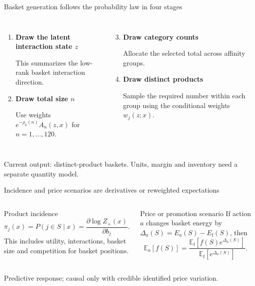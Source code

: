 \documentclass[aspectratio=169,11pt,t]{beamer}
\newcommand{\blue}[1]{\textcolor{Accent}{#1}}
\begin{document}
\begin{frame}{Basket generation follows the probability law in four stages}
\small
\begin{columns}[T,onlytextwidth]
  \begin{enumerate}
    \item \textbf{Draw the latent interaction state $z$}\par
          This summarizes the low-rank basket interaction direction.
    \item \textbf{Draw total size $n$}\par
          Use weights $e^{-\rho_0(n)}A_n(z,x)$ for $n=1,\ldots,120$.
  \end{enumerate}

  \begin{enumerate}
    \setcounter{enumi}{2}
    \item \textbf{Draw category counts}\par
          Allocate the selected total across affinity groups.
    \item \textbf{Draw distinct products}\par
          Sample the required number within each group using the conditional weights
          $w_j(z;x)$.
  \end{enumerate}
\end{columns}

\vspace{0.10cm}
\blue{Current output: distinct-product baskets. Units, margin and inventory need a
separate quantity model.}
\end{frame}

\begin{frame}{Incidence and price scenarios are derivatives or reweighted expectations}
\small
\begin{columns}[T,onlytextwidth]
  \begin{block}{Product incidence}
  \[
  \pi_j(x)=P(j\in S\mid x)
  =\frac{\partial\log Z_{+}(x)}{\partial b_j}.
  \]
  This includes utility, interactions, basket size and competition for basket positions.
  \end{block}

  \begin{block}{Price or promotion scenario}
  If action $a$ changes basket energy by
  $\Delta_a(S)=E_a(S)-E_{\mathrm f}(S)$, then
  \[
  \mathbb E_a[f(S)]
  =\frac{\mathbb E_{\mathrm f}[f(S)e^{\Delta_a(S)}]}
  {\mathbb E_{\mathrm f}[e^{\Delta_a(S)}]}.
  \]
  \end{block}
\end{columns}

\vspace{0.05cm}
\blue{Predictive response; causal only with credible identified price variation.}
\end{frame}
\end{document}
